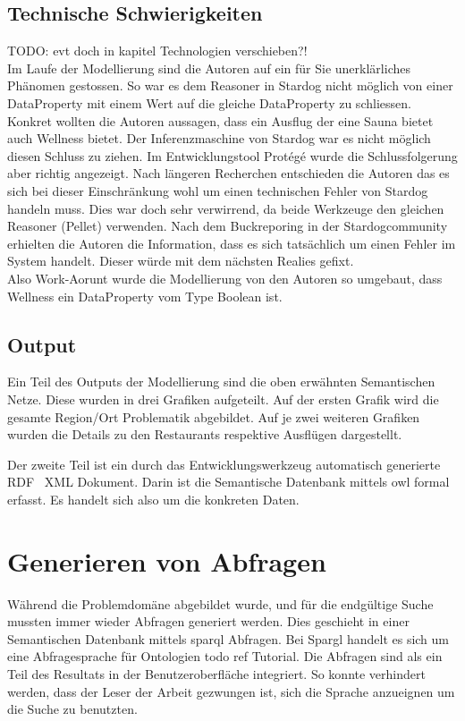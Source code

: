  
\subsection{Technische Schwierigkeiten}
\label{subsec:loesung_modellierung_technischeSchwierigkeiten}
TODO: evt doch in kapitel Technologien verschieben?!\\
Im Laufe der Modellierung sind die Autoren auf ein für Sie unerklärliches Phänomen gestossen. So war es dem Reasoner in Stardog nicht möglich von einer DataProperty mit einem Wert auf die gleiche DataProperty zu schliessen. Konkret wollten die Autoren aussagen, dass ein Ausflug der eine Sauna bietet auch Wellness bietet. Der Inferenzmaschine von Stardog war es nicht möglich diesen Schluss zu ziehen. Im Entwicklungstool Protégé wurde die Schlussfolgerung aber richtig angezeigt. Nach längeren Recherchen entschieden die Autoren das es sich bei dieser Einschränkung wohl um einen technischen Fehler von Stardog handeln muss. Dies war doch sehr verwirrend, da beide Werkzeuge den gleichen Reasoner (Pellet) verwenden. Nach dem Buckreporing in der Stardogcommunity erhielten die Autoren die Information, dass es sich tatsächlich um einen Fehler im System handelt. Dieser würde mit dem nächsten Realies gefixt. \\
Also Work-Aorunt wurde die Modellierung von den Autoren so umgebaut, dass Wellness ein DataProperty vom Type Boolean ist.

\subsection{Output}
\label{subsec:loesung_modellierung_output}
Ein Teil des Outputs der Modellierung sind die oben erwähnten Semantischen Netze. Diese wurden in drei Grafiken aufgeteilt. Auf der ersten Grafik wird die gesamte Region/Ort Problematik abgebildet. Auf je zwei weiteren Grafiken wurden die Details zu den Restaurants respektive Ausflügen dargestellt.

Der zweite Teil ist ein durch das Entwicklungswerkzeug automatisch generierte RDF \ XML Dokument. Darin ist die Semantische Datenbank mittels owl formal erfasst. Es handelt sich also um die konkreten Daten.

\section{Generieren von Abfragen}
\label{sec:loesung_sparql}

Während die Problemdomäne abgebildet wurde, und für die endgültige Suche mussten immer wieder Abfragen generiert werden. Dies geschieht in einer Semantischen Datenbank mittels sparql Abfragen. Bei Spargl handelt es sich um eine  Abfragesprache für Ontologien todo ref Tutorial. Die Abfragen sind als ein Teil des Resultats in der Benutzeroberfläche integriert. So konnte verhindert werden, dass der Leser der Arbeit gezwungen ist, sich die Sprache anzueignen um die Suche zu benutzten.


